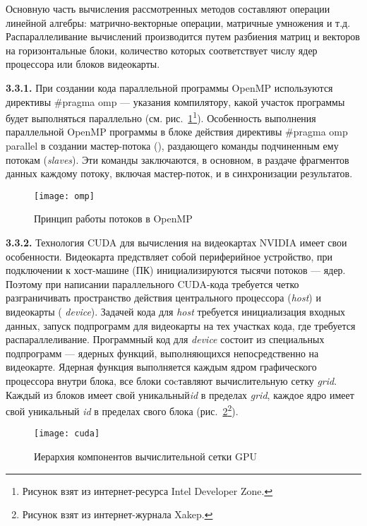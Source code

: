 Основную часть вычисления рассмотренных методов составляют операции линейной алгебры: матрично-векторные операции, матричные умножения и т.д. Распараллеливание вычислений производится путем разбиения матриц и векторов на горизонтальные блоки, количество которых соответствует числу ядер процессора или блоков видеокарты.

{\bfseries 3.3.1.} При создании кода параллельной программы OpenMP используются директивы \#pragma omp --- указания компилятору, какой участок программы будет выполняться параллельно (см. рис.~\ref{fig:omp}\footnote{Рисунок взят из интернет-ресурса Intel Developer Zone.}). Особенность выполнения параллельной OpenMP программы в блоке действия директивы \#pragma omp parallel в создании мастер-потока (), раздающего команды подчиненным ему потокам (\textit{slaves}). Эти команды заключаются, в основном, в раздаче фрагментов данных каждому потоку, включая мастер-поток, и в синхронизации результатов. 
\begin{figure}
	\centering
	\texttt{[image: omp]}
	\caption{Принцип работы потоков в OpenMP}
	\label{fig:omp}
\end{figure}

{\bfseries 3.3.2.} Технология CUDA для вычисления на видеокартах NVIDIA имеет свои особенности. Видеокарта предствляет собой периферийное устройство, при подключении к хост-машине (ПК) инициализируются тысячи потоков --- ядер. Поэтому при написании параллельного CUDA-кода требуется четко разграничивать пространство действия центрального процессора (\textit{host}) и видеокарты (\textit{ device}). Задачей кода для \textit{host} требуется инициализация входных данных, запуск подпрограмм для видеокарты на тех участках кода, где требуется распараллеливание. Программный код для \textit{device} состоит из специальных подпрограмм --- ядерных функций, выполняющихся непосредственно на видеокарте. Ядерная функция выполняется каждым ядром графического процессора внутри блока, все блоки соcтавляют вычислительную сетку \textit{grid}. Каждый из блоков имеет свой уникальный\textit{id} в пределах \textit{grid}, каждое ядро имеет свой уникальный \textit{id} в пределах свого блока (рис.~\ref{fig:cuda}\footnote{Рисунок взят из интернет-журнала Xakep.}).  

\begin{figure}
	\centering
	\texttt{[image: cuda]}
	\caption{Иерархия компонентов вычислительной сетки GPU}
	\label{fig:cuda}
\end{figure}

